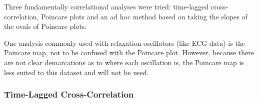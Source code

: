 \documentclass[12pt]{article}
\begin{document}
Three fundamentally correlational analyses were tried: time-lagged cross-correlation, Poincare plots and an ad hoc method based on taking the slopes of the ovals of Poincare plots.

One analysis commonly used with relaxation oscillators (like ECG data) is the Poincare map, not to be confused with the Poincare plot. However, because there are not clear demarcations as to where each oscillation is, the Poincare map is less suited to this dataset and will not be used\cite{poincaremap}.

\subsubsection{Time-Lagged Cross-Correlation}

\end{document}
